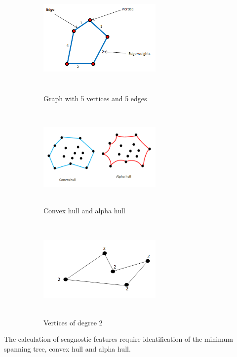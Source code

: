 \documentclass{article}
\begin{document}
\begin{figure}[!ht]
\begin{subfigure}{.5\textwidth}
\centering
        \includegraphics[width=60mm, height=50mm]{./Figures/c4new.png}
        \caption{\label{scagimg5}Graph with 5 vertices and 5 edges}

\centering
        \includegraphics[width=60mm, height=50mm]{./Figures/c5.png}
        \caption{\label{scagimg4}Convex hull and alpha hull}
        
\end{subfigure} 
\begin{subfigure}{.5\textwidth}
\centering
        \includegraphics[width=60mm, height=50mm]{./Figures/c3.png}
        \caption{\label{scagimg6}Vertices of degree 2}
        
\end{subfigure} 

\caption{}
        \end{figure}

The calculation of scagnostic features require identification of the
minimum spanning tree, convex hull and alpha hull.
\end{document}
